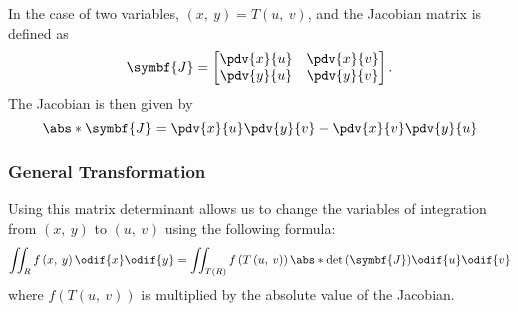 \documentclass{article}
\begin{document}
In the case of two variables, \(\left( x,\: y \right) = T\left( u,\: v \right)\),
and the Jacobian matrix is defined as
\begin{equation*}
    \symbf{J} =
    \begin{bmatrix}
        \displaystyle\pdv{x}{u} & \displaystyle\pdv{x}{v} \\
        \displaystyle\pdv{y}{u} & \displaystyle\pdv{y}{v} \\
    \end{bmatrix}
    .
\end{equation*}
The Jacobian is then given by
\begin{equation*}
    \abs*{\symbf{J}} = \pdv{x}{u} \pdv{y}{v} - \pdv{x}{v} \pdv{y}{u}
\end{equation*}
\subsubsection{General Transformation}
Using this matrix determinant allows us to change the variables of
integration from \(\left( x,\: y \right)\) to \(\left( u,\: v \right)\)
using the following formula:
\begin{equation*}
    \iint_{R} f\left( x,\: y \right) \odif{x}\odif{y} = \iint_{T\left( R \right)} f\left( T\left( u,\: v \right) \right) \abs*{\det{\left( \symbf{J} \right)}} \odif{u}\odif{v}
\end{equation*}
where \(f\left( T\left( u,\: v \right) \right)\) is multiplied by the absolute value of the
Jacobian.
\end{document}
